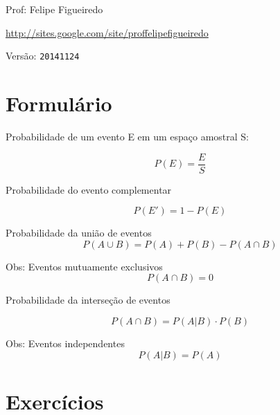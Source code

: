 \documentclass[a4paper]{article}
\begin{document}
\parbox[c]{.825\textwidth}{\raggedright%
{Prof: Felipe Figueiredo\par}
{\url{http://sites.google.com/site/proffelipefigueiredo}\par}
}

Versão: \verb|20141124|



\section{Formulário}

Probabilidade de um evento E em um espaço amostral S:

\begin{displaymath}
  P(E) = \frac{E}{S}
\end{displaymath}

Probabilidade do evento complementar

\begin{displaymath}
  P(E') = 1 - P(E)
\end{displaymath}


Probabilidade da união de eventos
\begin{displaymath}
  P(A \cup B) = P(A) + P(B) - P (A \cap B)
\end{displaymath}

Obs: Eventos mutuamente exclusivos
\begin{displaymath}
  P(A \cap B) = 0
\end{displaymath}

Probabilidade da interseção de eventos

\begin{displaymath}
  P(A \cap B) = P(A|B) \cdot P(B)
\end{displaymath}

Obs: Eventos independentes
\begin{displaymath}
  P(A|B) = P(A)
\end{displaymath}
\section{Exercícios}
\end{document}
